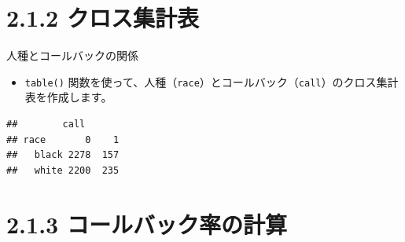 \documentclass[
  ignorenonframetext,
]{beamer}
\newenvironment{Shaded}{\begin{snugshade}}{\end{snugshade}}
\newcommand{\AttributeTok}[1]{\textcolor[rgb]{0.77,0.63,0.00}{#1}}
\newcommand{\CommentTok}[1]{\textcolor[rgb]{0.56,0.35,0.01}{\textit{#1}}}
\newcommand{\FunctionTok}[1]{\textcolor[rgb]{0.00,0.00,0.00}{#1}}
\newcommand{\NormalTok}[1]{#1}
\newcommand{\OtherTok}[1]{\textcolor[rgb]{0.56,0.35,0.01}{#1}}
\newcommand{\SpecialCharTok}[1]{\textcolor[rgb]{0.00,0.00,0.00}{#1}}
\providecommand{\tightlist}{%
  \setlength{\itemsep}{0pt}\setlength{\parskip}{0pt}}
\begin{document}
\hypertarget{ux30afux30edux30b9ux96c6ux8a08ux8868}{%
\section{2.1.2
クロス集計表}\label{ux30afux30edux30b9ux96c6ux8a08ux8868}}

\begin{frame}[fragile]{人種とコールバックの関係}
\protect\hypertarget{ux4ebaux7a2eux3068ux30b3ux30fcux30ebux30d0ux30c3ux30afux306eux95a2ux4fc2}{}
\begin{itemize}
\tightlist
\item
  \texttt{table()}
  関数を使って、人種（\texttt{race}）とコールバック（\texttt{call}）のクロス集計表を作成します。
\end{itemize}

\scriptsize

\begin{Shaded}
\end{Shaded}

\begin{verbatim}
##        call
## race       0    1
##   black 2278  157
##   white 2200  235
\end{verbatim}

\normalsize
\end{frame}

\hypertarget{ux30b3ux30fcux30ebux30d0ux30c3ux30afux7387ux306eux8a08ux7b97}{%
\section{2.1.3
コールバック率の計算}\label{ux30b3ux30fcux30ebux30d0ux30c3ux30afux7387ux306eux8a08ux7b97}}
\end{document}
